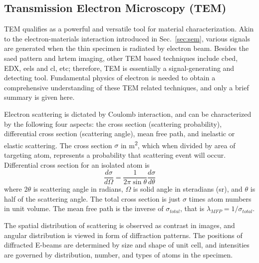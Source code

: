 \subsection{Transmission Electron Microscopy (TEM)}

TEM qualifies as a powerful and versatile tool for material characterization. Akin to the electron-materials interaction introduced in Sec.~\ref{sec:sem}, various signals are generated when the thin specimen is radiated by electron beam. Besides the \gls{saed} pattern and \gls{hrtem} imaging, other TEM based techniques include \gls{cbed}, EDX, \gls{eels} and \gls{cl}, etc; therefore, TEM is essentially a signal-generating and detecting tool.\cite{Williams2009} Fundamental physics of electron is needed to obtain a comprehensive understanding of these TEM related techniques, and only a brief summary is given here.

Electron scattering is dictated by Coulomb interaction, and can be characterized by the following four aspects: the cross section (scattering probability), differential cross section (scattering angle), mean free path, and inelastic or elastic scattering. The cross section $\sigma$ in \si{m^2}, which when divided by area of targeting atom, represents a probability that scattering event will occur. Differential cross section for an isolated atom is 
\[
\frac{d\sigma}{d\Omega} = \frac{1}{2\pi \sin\theta} \frac{d\sigma}{d\theta}
\] 
where $2\theta$ is scattering angle in radians, $\Omega$ is solid angle in steradians (sr), and $\theta$ is half of the scattering angle. The total cross section is just $\sigma$ times atom numbers in unit volume. The mean free path is the inverse of $\sigma_{total}$, that is $\lambda_{MFP} = 1/\sigma_{total}$. 

The spatial distribution of scattering is observed as contrast in images, and angular distribution is viewed in form of diffraction patterns. The positions of diffracted E-beams are determined by size and shape of unit cell, and intensities are governed by distribution, number, and types of atoms in the specimen. 

